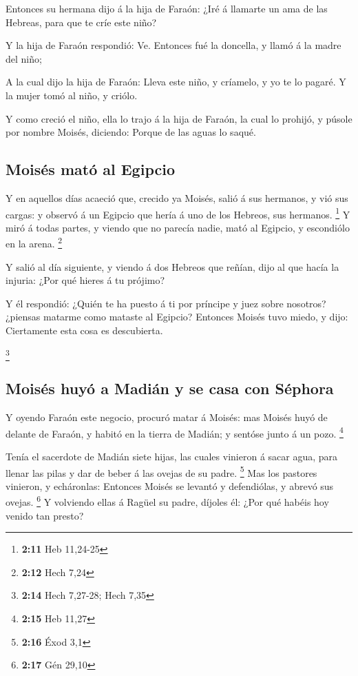 Entonces su hermana dijo á la hija de Faraón: ¿Iré á
llamarte un ama de las Hebreas, para que te críe este niño?

 Y la hija de Faraón respondió: Ve. Entonces fué la
doncella, y llamó á la madre del niño;

 A la cual dijo la hija de Faraón: Lleva este niño, y
críamelo, y yo te lo pagaré. Y la mujer tomó al niño, y criólo.

 Y como creció el niño, ella lo trajo á la hija de
Faraón, la cual lo prohijó, y púsole por nombre Moisés, diciendo: Porque
de las aguas lo saqué.

\hypertarget{moisuxe9s-matuxf3-al-egipcio}{%
\subsection{Moisés mató al Egipcio}\label{moisuxe9s-matuxf3-al-egipcio}}

 Y en aquellos días acaeció que, crecido ya Moisés, salió
á sus hermanos, y vió sus cargas: y observó á un Egipcio que hería á uno
de los Hebreos, sus hermanos. \footnote{\textbf{2:11} Heb 11,24-25}
 Y miró á todas partes, y viendo que no parecía nadie,
mató al Egipcio, y escondiólo en la arena. \footnote{\textbf{2:12} Hech
  7,24}

 Y salió al día siguiente, y viendo á dos Hebreos que
reñían, dijo al que hacía la injuria: ¿Por qué hieres á tu prójimo?

 Y él respondió: ¿Quién te ha puesto á ti por príncipe y
juez sobre nosotros? ¿piensas matarme como mataste al Egipcio? Entonces
Moisés tuvo miedo, y dijo: Ciertamente esta cosa es descubierta.

\footnote{\textbf{2:14} Hech 7,27-28; Hech 7,35}

\hypertarget{moisuxe9s-huyuxf3-a-madiuxe1n-y-se-casa-con-suxe9phora}{%
\subsection{Moisés huyó a Madián y se casa con
Séphora}\label{moisuxe9s-huyuxf3-a-madiuxe1n-y-se-casa-con-suxe9phora}}

 Y oyendo Faraón este negocio, procuró matar á Moisés:
mas Moisés huyó de delante de Faraón, y habitó en la tierra de Madián; y
sentóse junto á un pozo. \footnote{\textbf{2:15} Heb 11,27}

 Tenía el sacerdote de Madián siete hijas, las cuales
vinieron á sacar agua, para llenar las pilas y dar de beber á las ovejas
de su padre. \footnote{\textbf{2:16} Éxod 3,1}  Mas los
pastores vinieron, y echáronlas: Entonces Moisés se levantó y
defendiólas, y abrevó sus ovejas. \footnote{\textbf{2:17} Gén 29,10}
 Y volviendo ellas á Ragüel su padre, díjoles él: ¿Por
qué habéis hoy venido tan presto?

